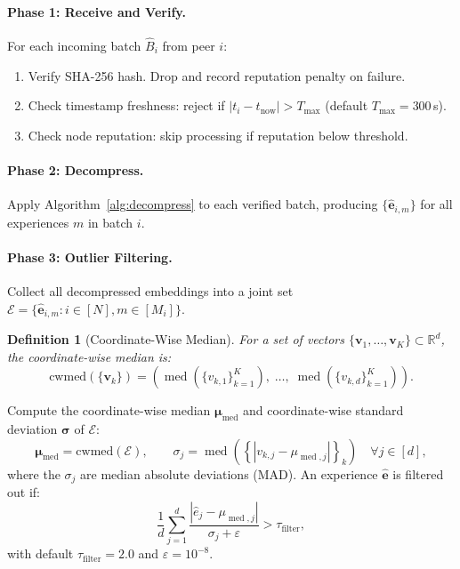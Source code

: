 \documentclass[11pt]{article}
\newtheorem{definition}{Definition}
\DeclareMathOperator{\med}{med}
\begin{document}
\paragraph{Phase 1: Receive and Verify.}
For each incoming batch $\hat{B}_i$ from peer $i$:
\begin{enumerate}[leftmargin=1.5em]
    \item Verify SHA-256 hash. Drop and record reputation penalty on failure.
    \item Check timestamp freshness: reject if $|t_i - t_{\text{now}}| > T_{\max}$
          (default $T_{\max} = 300$\,s).
    \item Check node reputation: skip processing if reputation below threshold.
\end{enumerate}

\paragraph{Phase 2: Decompress.}
Apply Algorithm~\ref{alg:decompress} to each verified batch, producing
$\{\hat{\bm{e}}_{i,m}\}$ for all experiences $m$ in batch $i$.

\paragraph{Phase 3: Outlier Filtering.}
Collect all decompressed embeddings into a joint set
$\mathcal{E} = \{\hat{\bm{e}}_{i,m} : i \in [N], m \in [M_i]\}$.

\begin{definition}[Coordinate-Wise Median]
\label{def:cwmed}
For a set of vectors $\{\bm{v}_1, \ldots, \bm{v}_K\} \subset \mathbb{R}^d$,
the coordinate-wise median is:
\begin{equation}
    \text{cwmed}(\{\bm{v}_k\}) = \left(\med(\{v_{k,1}\}_{k=1}^K), \;\ldots,\;
    \med(\{v_{k,d}\}_{k=1}^K)\right).
\end{equation}
\end{definition}

Compute the coordinate-wise median $\bm{\mu}_{\med}$ and coordinate-wise
standard deviation $\bm{\sigma}$ of $\mathcal{E}$:
\begin{equation}
    \bm{\mu}_{\med} = \text{cwmed}(\mathcal{E}),
    \qquad
    \sigma_j = \med\!\left(\left\{|v_{k,j} - \mu_{\med,j}|\right\}_k\right)
    \quad \forall j \in [d],
    \label{eq:mad}
\end{equation}
where the $\sigma_j$ are median absolute deviations (MAD). An experience
$\hat{\bm{e}}$ is filtered out if:
\begin{equation}
    \frac{1}{d}\sum_{j=1}^{d} \frac{|\hat{e}_j - \mu_{\med,j}|}{\sigma_j + \varepsilon} > \tau_{\text{filter}},
    \label{eq:filter}
\end{equation}
with default $\tau_{\text{filter}} = 2.0$ and $\varepsilon = 10^{-8}$.
\end{document}

